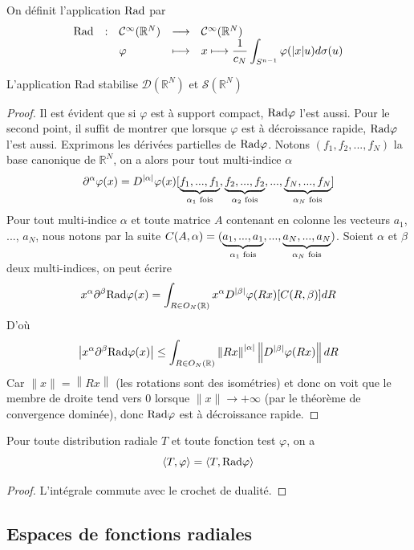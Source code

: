 \documentclass[11pt,a4paper]{article}
\begin{document}
\begin{Def} On définit l'application $\textup{Rad}$ par \[\begin{array}{lllll} \textup{Rad} & : & \mathcal{C}^\infty(\mathbb{R}^N) & \longrightarrow & \mathcal{C}^\infty(\mathbb{R}^N) \\ & & \varphi & \longmapsto &\displaystyle x\longmapsto\frac{1}{c_N}\int_{S^{n-1}}\varphi(|x|u)d\sigma(u) \\ \end{array}\]
\end{Def}

\begin{Prop} L'application Rad stabilise $\mathcal{D}(\mathbb{R}^N)$ et $\mathcal{S}(\mathbb{R}^N)$
\begin{proof}
Il est évident que si $\varphi$ est à support compact, $\textup{Rad}\varphi$ l'est aussi. Pour le second point, il suffit de montrer que lorsque $\varphi$ est à décroissance rapide, $\textup{Rad}\varphi$ l'est aussi. Exprimons les dérivées partielles de $\textup{Rad}\varphi$. Notons $(f_1,f_2,...,f_N)$ la base canonique de $ \mathbb{R}^N$, on a alors pour tout multi-indice $\alpha$  \[\partial^\alpha \varphi(x) = D^{|\alpha|}\varphi(x)[\underbrace{f_1,...,f_1}_{\alpha_1 \textup{ fois}},\underbrace{f_2,...,f_2}_{\alpha_2 \textup{ fois}},...,\underbrace{f_N,...,f_N}_{\alpha_N \textup{ fois}}] \] Pour tout multi-indice $\alpha$ et toute matrice $A$ contenant en colonne les vecteurs $a_1$, ..., $a_N$, nous notons par la suite $C(A,\alpha) = (\underbrace{a_1,...,a_1}_{\alpha_1 \textup{ fois}},...,\underbrace{a_N,...,a_N}_{\alpha_N \textup{ fois}})$. Soient $\alpha$ et $\beta$ deux multi-indices, on peut écrire \[ x^\alpha \partial^\beta \textup{Rad}\varphi(x) = \int_{R\in O_N(\mathbb{R})} x^\alpha D^{|\beta|}\varphi(Rx)[C(R,\beta)]dR\] D'où \[ \left|x^\alpha \partial^\beta\textup{Rad}\varphi(x)\right| \leq \int_{R\in O_N(\mathbb{R})} \left\|Rx\right\|^{|\alpha|} \left\|D^{|\beta|}\varphi(Rx)\right\|dR\]
Car $\|x\| = \left\|Rx\right\|$ (les rotations sont des isométries) et donc on voit que le membre de droite tend vers 0 lorsque $\|x\| \to + \infty$ (par le théorème de convergence dominée), donc $\textup{Rad}\varphi$ est à décroissance rapide. 
\end{proof} 
\end{Prop}

\begin{Prop} Pour toute distribution radiale $T$ et toute fonction test $\varphi$, on a \[\left\langle T,\varphi\right\rangle = \left\langle T,\textup{Rad}\varphi\right\rangle\]
\begin{proof}
L'intégrale commute avec le crochet de dualité. 
\end{proof}
\end{Prop}


\subsection{Espaces de fonctions radiales}
\end{document}
